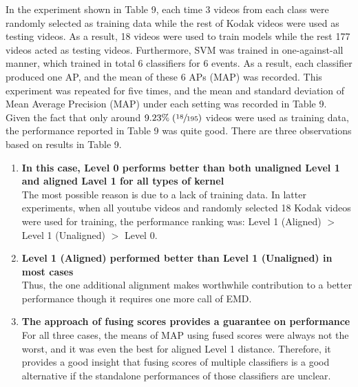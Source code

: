 \noindent In the experiment shown in Table 9, each time 3 videos from each class were randomly selected as training data while the rest of Kodak videos were used as testing videos. As a result, 18 videos were used to train models while the rest 177 videos acted as testing videos. Furthermore, SVM was trained in one-against-all manner, which trained in total 6 classifiers for 6 events. As a result, each classifier produced one AP, and the mean of these 6 APs (MAP) was recorded. This experiment was repeated for five times, and the mean and standard deviation of Mean Average Precision (MAP)  under each setting was recorded in Table 9. Given the fact that only around $9.23\% \; (\sfrac{18}{195})$ videos were used as training data, the performance reported in Table 9 was quite good. There are three observations based on results in Table 9. 
\begin{enumerate}
  \item{\bf In this case, Level 0 performs better than both unaligned Level 1 and aligned Lavel 1 for all types of kernel} \\
  The most possible reason is due to a lack of training data. In latter experiments, when all youtube videos and randomly selected 18 Kodak videos were used for training, the performance ranking was: Level 1 (Aligned) $>$ Level 1 (Unaligned) $>$ Level 0. 

  \item{\bf Level 1 (Aligned) performed better than Level 1 (Unaligned) in most cases}\\
  Thus, the one additional alignment makes worthwhile contribution to a better performance though it requires one more call of EMD. 

  \item{\bf The approach of fusing scores provides a guarantee on performance}\\
  For all three cases, the means of MAP using fused scores were always not the worst, and it was even the best for aligned Level 1 distance. Therefore, it provides a good insight that fusing scores of multiple classifiers is a good alternative if the standalone performances of those classifiers are unclear.

\end{enumerate}


